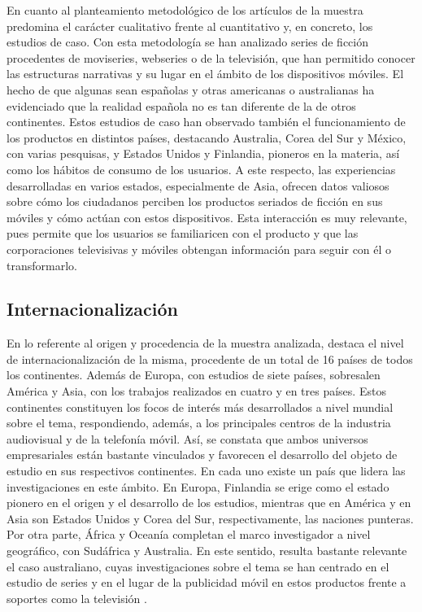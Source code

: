 \documentclass[spanish]{textolivre}
\begin{document}
En cuanto al planteamiento metodológico de los artículos de la muestra predomina el carácter cualitativo frente al cuantitativo y, en concreto, los estudios de caso. Con esta metodología se han analizado series de ficción procedentes de moviseries, webseries o de la televisión, que han permitido conocer las estructuras narrativas y su lugar en el ámbito de los dispositivos móviles. El hecho de que algunas sean españolas y otras americanas o australianas ha evidenciado que la realidad española no es tan diferente de la de otros continentes. Estos estudios de caso han observado también el funcionamiento de los productos en distintos países, destacando Australia, Corea del Sur y México, con varias pesquisas, y Estados Unidos y Finlandia, pioneros en la materia, así como los hábitos de consumo de los usuarios. A este respecto, las experiencias desarrolladas en varios estados, especialmente de Asia, ofrecen datos valiosos sobre cómo los ciudadanos perciben los productos seriados de ficción en sus móviles y cómo actúan con estos dispositivos. Esta interacción es muy relevante, pues permite que los usuarios se familiaricen con el producto y que las corporaciones televisivas y móviles obtengan información para seguir con él o transformarlo. 

\subsection{Internacionalización}
En lo referente al origen y procedencia de la muestra analizada, destaca el nivel de internacionalización de la misma, procedente de un total de 16 países de todos los continentes. Además de Europa, con estudios de siete países, sobresalen América y Asia, con los trabajos realizados en cuatro y en tres países. Estos continentes constituyen los focos de interés más desarrollados a nivel mundial sobre el tema, respondiendo, además, a los principales centros de la industria audiovisual y de la telefonía móvil. Así, se constata que ambos universos empresariales están bastante vinculados y favorecen el desarrollo del objeto de estudio en sus respectivos continentes. En cada uno existe un país que lidera las investigaciones en este ámbito. En Europa, Finlandia se erige como el estado pionero en el origen y el desarrollo de los estudios, mientras que en América y en Asia son Estados Unidos y Corea del Sur, respectivamente, las naciones punteras. Por otra parte, África y Oceanía completan el marco investigador a nivel geográfico, con Sudáfrica y Australia. En este sentido, resulta bastante relevante el caso australiano, cuyas investigaciones sobre el tema se han centrado en el estudio de series \cite{monaghan2017} y en el lugar de la publicidad móvil en estos productos frente a soportes como la televisión \cite{varan2013}. 
\end{document}
